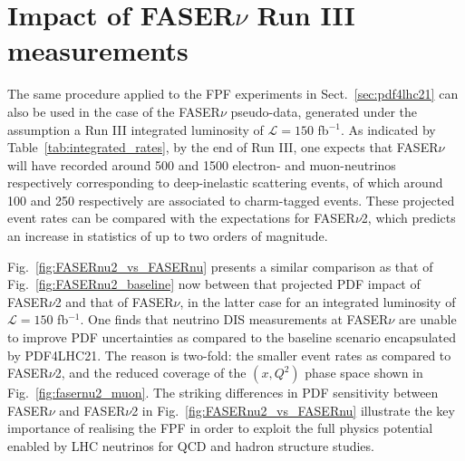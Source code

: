 \section{Impact of FASER$\nu$ Run III measurements}
\label{app:fasernu_runIII_impact}

The same procedure applied to the FPF experiments in Sect.~\ref{sec:pdf4lhc21}
can also be used in the case of the FASER$\nu$ pseudo-data, generated under the
assumption a Run III integrated
luminosity of $\mathcal{L}=150$ fb$^{-1}$.
%
As indicated by Table~\ref{tab:integrated_rates}, by the end of Run III, one expects
that FASER$\nu$ will have recorded around 500 and 1500 electron- and muon-neutrinos
respectively corresponding to deep-inelastic scattering events, of which around 100
and 250 respectively are associated to charm-tagged events.
%
These projected event rates can be compared with the expectations
for FASER$\nu$2, which predicts an increase in statistics of up to two orders
of magnitude.

Fig.~\ref{fig:FASERnu2_vs_FASERnu} presents a similar comparison as that of
Fig.~\ref{fig:FASERnu2_baseline} now between that projected PDF impact of FASER$\nu$2 and that of
FASER$\nu$, in the latter
case for an integrated luminosity of $\mathcal{L}=150$ fb$^{-1}$.
%
One finds that neutrino DIS measurements at FASER$\nu$ are unable to improve
PDF uncertainties as compared to the baseline scenario encapsulated by PDF4LHC21.
%
The reason is two-fold: the smaller event rates as compared to FASER$\nu$2,
and the reduced coverage of the $(x,Q^2)$ phase space shown in Fig.~\ref{fig:fasernu2_muon}.
%
The striking differences in PDF sensitivity between FASER$\nu$ and FASER$\nu$2 in
Fig.~\ref{fig:FASERnu2_vs_FASERnu} illustrate
the key importance of realising the FPF in order to exploit the full physics potential enabled 
by LHC neutrinos for QCD and hadron structure studies.

